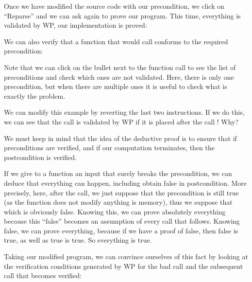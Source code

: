 Once we have modified the source code with our precondition, we click on
``Reparse'' and we can ask again to prove our program. This time,
everything is validated by WP, our implementation is proved:





We can also verify that a function that would call 
conforms to the required precondition:







Note that we can click on the bullet next to the function call to see the
list of preconditions and check which ones are not validated. Here, there is
only one precondition, but when there are multiple ones it is useful to check
what is exactly the problem.



We can modify this example by reverting the last two instructions. If we
do this, we can see that the call  is validated by WP if
it is placed after the call ! Why?



We must keep in mind that the idea of the deductive proof is to ensure
that if preconditions are verified, and if our computation terminates,
then the postcondition is verified.



If we give to a function an input that surely breaks the precondition, we can
deduce that everything can happen, including obtain false in postcondition.
More precisely, here, after the call, we just suppose that the precondition
is still true (as the function does not modify anything is memory), thus we
suppose that  which is obviously false.
Knowing this, we can prove absolutely everything because this ``false'' becomes
an assumption of every call that follows. Knowing false, we can prove everything,
because if we have a proof of false, then false is true, as well as true is true.
So everything is true.



Taking our modified program, we can convince ourselves of this fact by
looking at the verification conditions generated by WP for the bad call and the
subsequent call that becomes verified:



